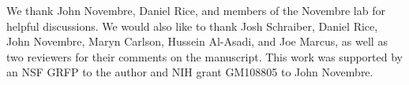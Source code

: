 We thank John Novembre, Daniel Rice, and members of the Novembre lab for helpful
discussions. We would also like to thank Josh Schraiber, Daniel Rice, John
Novembre, Maryn Carlson, Hussein Al-Asadi, and Joe Marcus, as well as two
reviewers for their comments on the manuscript. This work was supported by an
NSF GRFP to the author and NIH grant GM108805 to John Novembre.
